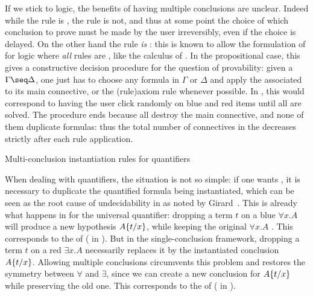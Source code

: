 \begin{scope}
If we stick to  logic, the benefits of having multiple
conclusions are unclear. Indeed while the {} rule is ,
the {} rule is not, and thus at some point the choice of which
conclusion to prove must be made by the user irreversibly, even if the choice is
delayed. On the other hand the
{} rule \emph{is} : this is known to allow the
formulation of  for  logic where \emph{all}
rules are , like the  calculus of
. In the propositional case, this gives a
constructive decision procedure for the question of provability: given a
 $\Gamma \seq \Delta$, one just has to choose any formula in
$\Gamma$ or $\Delta$ and apply the  associated to its main
connective, or the \kl(rule){axiom} rule whenever possible. In , this
would correspond to having the user click randomly on blue and red items until
all  are solved. The procedure ends because all  destroy the main connective, and none of them duplicate formulas: thus
the total number of connectives in the  decreases strictly after
each rule application.

\begin{marginfigure}
  \caption{Multi-conclusion instantiation rules for quantifiers}
\end{marginfigure}

When dealing with quantifiers, the situation is not so simple: if one wants
 , it is necessary to duplicate the
quantified formula being instantiated, which can be seen as the root cause of
undecidability in  as noted by
Girard~\cite[Section~3.3.2]{girard:hal-01322183}. This is already what happens
in  for the universal quantifier: dropping a term $t$ on a blue
 $\forall x. A$ will produce a new hypothesis $A \{ t / x \}$, while
keeping the original $\forall x. A$ . This corresponds to the
  of  ({} in
). But in the single-conclusion framework, dropping a term
$t$ on a red  $\exists x. A$ necessarily replaces it by the
instantiated conclusion $A \{ t / x \}$. Allowing multiple conclusions
circumvents this problem and restores the symmetry between $\forall$ and
$\exists$, since we can create a new conclusion for $A \{ t / x \}$ while
preserving the old one. This corresponds to the   of  ({} in ).


\end{scope}
